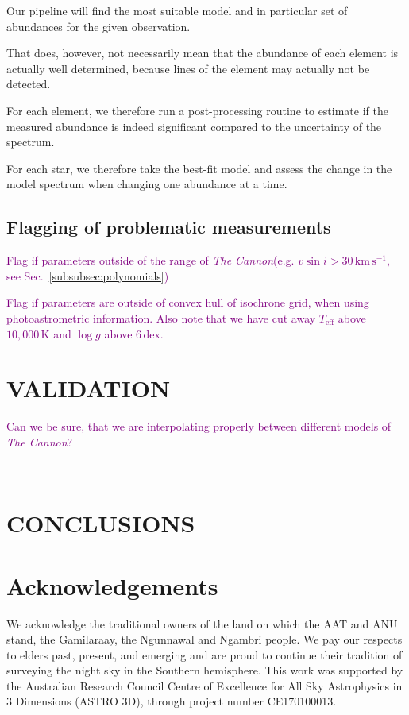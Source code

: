 \documentclass[
  journal=pasa,
  manuscript=research-paper, %
  year=2021,
  volume=37,
]{cup-journal}
\newcommand{\SB}[1]{{\textcolor{purple}{#1}}}
\newcommand{\Teff}{$T_\mathrm{eff}$\xspace}
\newcommand{\logg}{$\log g$\xspace}
\newcommand{\vsini}{$v \sin i$\xspace}
\newcommand{\TheCannon}{\textit{The Cannon}\xspace}
\newcommand{\dex}{\,\mathrm{dex}}	%
\newcommand{\K}{\,\mathrm{K}}	%
\newcommand{\kms}{\,\mathrm{km\,s^{-1}}}	%
\begin{document}
Our pipeline will find the most suitable model and in particular set of abundances for the given observation.

That does, however, not necessarily mean that the abundance of each element is actually well determined, because lines of the element may actually not be detected.

For each element, we therefore run a post-processing routine to estimate if the measured abundance is indeed significant compared to the uncertainty of the spectrum.

For each star, we therefore take the best-fit model and assess the change in the model spectrum when changing one abundance at a time.

\subsection{Flagging of problematic measurements}

\SB{Flag if parameters outside of the range of \TheCannon (e.g. \vsini$ > 30 \kms$, see Sec.~\ref{subsubsec:polynomials})}

\SB{Flag if parameters are outside of convex hull of isochrone grid, when using photoastrometric information. Also note that we have cut away \Teff above $10,000\K$ and \logg above $6\dex$.}

\newpage
\section{VALIDATION} \label{sec:validation}

\SB{Can we be sure, that we are interpolating properly between different models of \TheCannon?}

\newpage $\,$ \newpage
\section{CONCLUSIONS} \label{sec:conclusion}

\section*{Acknowledgements}

We acknowledge the traditional owners of the land on which the AAT and ANU stand, the Gamilaraay, the Ngunnawal and Ngambri people. We pay our respects to elders past, present, and emerging and are proud to continue their tradition of surveying the night sky in the Southern hemisphere.
This work was supported by the Australian Research Council Centre of Excellence for All Sky Astrophysics in 3 Dimensions (ASTRO 3D), through project number CE170100013.
\end{document}
